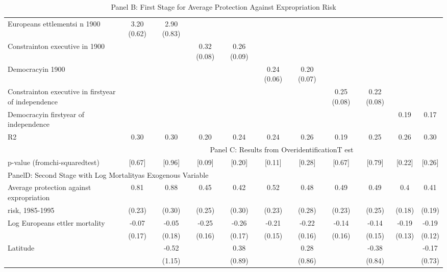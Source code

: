 \begin{table}[htbp]
\centering
\caption{Panel B: First Stage for Average Protection  Against Expropriation Risk}
\begin{tabular}{lcccccccccc}
\hline
Europeans ettlementsi n 1900 & 3.20 (0.62) & 2.90 (0.83) &  &  &  &  &  &  &  &  \\
Constrainton executive in 1900 &  &  & 0.32 (0.08) & 0.26 (0.09) &  &  &  &  &  &  \\
Democracyin 1900 &  &  &  &  & 0.24 (0.06) & 0.20 (0.07) &  &  &  &  \\
Constrainton executive in firstyear of independence &  &  &  &  &  &  & 0.25 (0.08) & 0.22 (0.08) &  &  \\
Democracyin firstyear of independence &  &  &  &  &  &  &  &  & 0.19 & 0.17 \\
R2 & 0.30 & 0.30 & 0.20 & 0.24 & 0.24 & 0.26 & 0.19 & 0.25 & 0.26 & 0.30 \\
 & \multicolumn{10}{c}{Panel C: Results from OveridentificationT est} \\
p-value (fromchi-squaredtest) & [0.67] & [0.96] & [0.09] & [0.20] & [0.11] & [0.28] & [0.67] & [0.79] & [0.22] & [0.26] \\
\multicolumn{11}{l}{PanelD: Second Stage with Log Mortalityas Exogenous Variable} \\
Average protection against expropriation & 0.81 & 0.88 & 0.45 & 0.42 & 0.52 & 0.48 & 0.49 & 0.49 & 0.4 & 0.41 \\
risk, 1985-1995 & (0.23) & (0.30) & (0.25) & (0.30) & (0.23) & (0.28) & (0.23) & (0.25) & (0.18) & (0.19) \\
Log Europeans ettler mortality & -0.07 & -0.05 & -0.25 & -0.26 & -0.21 & -0.22 & -0.14 & -0.14 & -0.19 & -0.19 \\
 & (0.17) & (0.18) & (0.16) & (0.17) & (0.15) & (0.16) & (0.16) & (0.15) & (0.13) & (0.12) \\
Latitude &  & -0.52 &  & 0.38 &  & 0.28 &  & -0.38 &  & -0.17 \\
 &  & (1.15) &  & (0.89) &  & (0.86) &  & (0.84) &  & (0.73) \\
\hline
\end{tabular}
\end{table}

